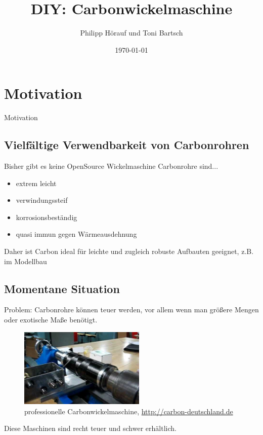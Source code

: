 \documentclass[12pt]{beamer}
\author{Philipp Hörauf und Toni Bartsch}
\title{DIY: Carbonwickelmaschine}
\date{\today}
\begin{document}
\begin{frame}
\titlepage
\end{frame}


\begin{frame}
\tableofcontents
\end{frame}

\section{Motivation}
\begin{frame}{Motivation}
\subsection{Vielfältige Verwendbarkeit von Carbonrohren}
Bisher gibt es keine OpenSource Wickelmaschine\newline
\vspace{1cm}
Carbonrohre sind...
\begin{itemize}
	\item extrem leicht
	\item verwindungssteif
	\item korrosionsbeständig
	\item quasi immun gegen Wärmeausdehnung
\end{itemize}
\vspace*{1cm}

Daher ist Carbon ideal für leichte und zugleich robuste Aufbauten geeignet, z.B. im Modellbau
\end{frame}


\begin{frame}
\subsection{Momentane Situation}
Problem: Carbonrohre können teuer werden, vor allem wenn man größere Mengen oder exotische Maße benötigt.\newline

\begin{figure}
	\includegraphics[width=6cm]{./hqdefault.jpg}
	\caption{professionelle Carbonwickelmaschine, \url{http://carbon-deutschland.de}}
\end{figure}

Diese Maschinen sind recht teuer und schwer erhältlich.
\end{frame}
\end{document}
